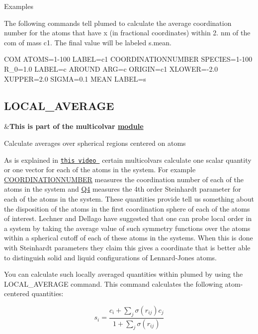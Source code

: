 \begin{DoxyParagraph}{Examples}

\end{DoxyParagraph}
The following commands tell plumed to calculate the average coordination number for the atoms that have x (in fractional coordinates) within 2. nm of the com of mass c1. The final value will be labeled s.\+mean. \begin{DoxyVerb}COM ATOMS=1-100 LABEL=c1
COORDINATIONNUMBER SPECIES=1-100 R_0=1.0 LABEL=c
AROUND ARG=c ORIGIN=c1 XLOWER=-2.0 XUPPER=2.0 SIGMA=0.1 MEAN LABEL=s
\end{DoxyVerb}
 \hypertarget{LOCAL_AVERAGE}{}\subsection{L\+O\+C\+A\+L\+\_\+\+A\+V\+E\+R\+A\+G\+E}\label{LOCAL_AVERAGE}
\begin{TabularC}{2}
\hline
&{\bfseries  This is part of the multicolvar \hyperlink{mymodules}{module }}   \\
\end{TabularC}
Calculate averages over spherical regions centered on atoms

As is explained in \href{http://www.youtube.com/watch?v=iDvZmbWE5ps}{\tt this video } certain multicolvars calculate one scalar quantity or one vector for each of the atoms in the system. For example \hyperlink{COORDINATIONNUMBER}{C\+O\+O\+R\+D\+I\+N\+A\+T\+I\+O\+N\+N\+U\+M\+B\+E\+R} measures the coordination number of each of the atoms in the system and \hyperlink{Q4}{Q4} measures the 4th order Steinhardt parameter for each of the atoms in the system. These quantities provide tell us something about the disposition of the atoms in the first coordination sphere of each of the atoms of interest. Lechner and Dellago \cite{dellago-q6} have suggested that one can probe local order in a system by taking the average value of such symmetry functions over the atoms within a spherical cutoff of each of these atoms in the systems. When this is done with Steinhardt parameters they claim this gives a coordinate that is better able to distinguish solid and liquid configurations of Lennard-\/\+Jones atoms.

You can calculate such locally averaged quantities within plumed by using the L\+O\+C\+A\+L\+\_\+\+A\+V\+E\+R\+A\+G\+E command. This command calculates the following atom-\/centered quantities\+:

\[ s_i = \frac{ c_i + \sum_j \sigma(r_{ij})c_j }{ 1 + \sum_j \sigma(r_{ij}) } \]

